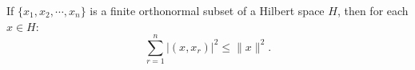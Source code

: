 If $\{x_1, x_2, \cdots, x_n\}$ is a finite orthonormal subset of a Hilbert space $H$, then for each $x \in H$:
$$\sum_{r=1}^n |(x, x_r)|^2 \leq \|x\|^2.$$
